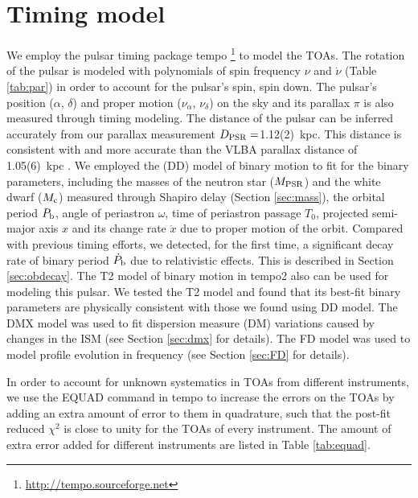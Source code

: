 \section{Timing model}
\label{sec:model}
We employ the pulsar timing package {\sc tempo}
\footnote{\url{http://tempo.sourceforge.net}} to model the TOAs. 
The rotation of the pulsar is modeled with polynomials of spin frequency 
$\nu$ and $\dot{\nu}$ (Table \ref{tab:par}) in order to account
for the pulsar's spin, spin down.
The pulsar's position ($\alpha$, $\delta$) and proper motion ($\nu_\alpha$, $
\nu_\delta$) on the sky and its parallax $\pi$ is also measured through timing modeling. 
The distance of the pulsar can be inferred accurately from our parallax
measurement $D_{\rm PSR}=$1.12(2)~kpc. This distance is consistent with and
more accurate than the VLBA parallax distance of 1.05(6)~kpc \citep{cbv+09}.
We employed the \citet{dd86} (DD) model of binary motion to fit for the binary parameters, 
including the masses of
the neutron star ($M_{\rm PSR}$) and the white dwarf ($M_{\rm c}$) measured
through Shapiro delay (Section \ref{sec:mass}),
the orbital period $P_{\rm b}$, angle of periastron $\omega$, time of
periastron passage $T_0$, projected semi-major axis $x$ and its change rate
$\dot{x}$ due to proper motion of the orbit. 
Compared with previous timing efforts, we detected, for the first time, a
significant decay rate of binary period $\dot{P}_{\rm b}$ due to relativistic
effects. This is described in Section \ref{sec:obdecay}.    
The T2 model of binary motion in {\sc tempo2} \citep{hem06} also can be used for modeling this pulsar. We tested the T2 model and found that its best-fit binary parameters are physically consistent with those we found using DD model.
The DMX model was used to fit dispersion measure (DM) variations caused by changes in the ISM (see Section \ref{sec:dmx} for details). The FD model was used to model profile
evolution in frequency (see Section \ref{sec:FD} for details). 

In order to account for unknown systematics in TOAs from different
instruments, we use the EQUAD command in {\sc tempo} to increase the errors on
the TOAs by adding an extra amount of error to them in quadrature, such that
the post-fit reduced $\chi^2$ is close to unity for the TOAs of every instrument. The amount
of extra error added for different instruments are listed in Table
\ref{tab:equad}.

